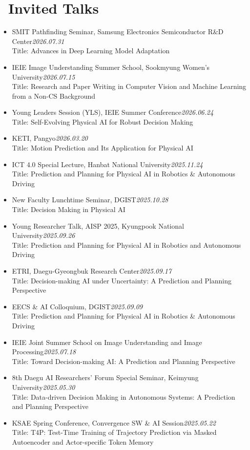 \documentclass[a4paper,11pt]{article}
\begin{document}
\section{\texorpdfstring{\faComments\ Invited Talks}{Invited Talks}}
\begin{itemize}[leftmargin=0.25cm]
    \item SMIT Pathfinding Seminar, Samsung Electronics Semiconductor R\&D Center\hfill \textit{2026.07.31}\\
    Title: Advances in Deep Learning Model Adaptation
    \item IEIE Image Understanding Summer School, Sookmyung Women's University\hfill \textit{2026.07.15}\\
    Title: Research and Paper Writing in Computer Vision and Machine Learning from a Non-CS Background
    \item Young Leaders Session (YLS), IEIE Summer Conference\hfill \textit{2026.06.24}\\
    Title: Self-Evolving Physical AI for Robust Decision Making
    \item KETI, Pangyo\hfill \textit{2026.03.20}\\
    Title: Motion Prediction and Its Application for Physical AI
    \item ICT 4.0 Special Lecture, Hanbat National University\hfill \textit{2025.11.24}\\
    Title: Prediction and Planning for Physical AI in Robotics \& Autonomous Driving
    \item New Faculty Lunchtime Seminar, DGIST\hfill \textit{2025.10.28}\\
    Title: Decision Making in Physical AI
    \item Young Researcher Talk, AISP 2025, Kyungpook National University\hfill \textit{2025.09.26}\\
    Title: Prediction and Planning for Physical AI in Robotics and Autonomous Driving
    \item ETRI, Daegu-Gyeongbuk Research Center\hfill \textit{2025.09.17}\\
    Title: Decision-making AI under Uncertainty: A Prediction and Planning Perspective
    \item EECS \& AI Colloquium, DGIST\hfill \textit{2025.09.09}\\
    Title: Prediction and Planning for Physical AI in Robotics \& Autonomous Driving
    \item IEIE Joint Summer School on Image Understanding and Image Processing\hfill \textit{2025.07.18}\\
    Title: Toward Decision-making AI: A Prediction and Planning Perspective
    \item 8th Daegu AI Researchers' Forum Special Seminar, Keimyung University\hfill \textit{2025.05.30}\\
    Title: Data-driven Decision Making in Autonomous Systems: A Prediction and Planning Perspective
    \item KSAE Spring Conference, Convergence SW \& AI Session\hfill \textit{2025.05.22}\\
    Title: T4P: Test-Time Training of Trajectory Prediction via Masked Autoencoder and Actor-specific Token Memory
\end{itemize}
\end{document}
